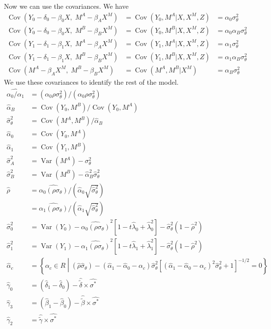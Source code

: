 \documentclass[11pt,letterpaper]{article}
\DeclareMathOperator{\Var}{Var}
\DeclareMathOperator{\Cov}{Cov}
\begin{document}
Now we can use the covariances. We have
\begin{align*}
\Cov(Y_0 - \delta_0 - \beta_0 X,\; M^A - \beta_A X^M) &= \Cov(Y_0, M^A | X, X^M, Z) &= \alpha_0 \sigma^2_\theta \\
\Cov(Y_0 - \delta_0 - \beta_0 X,\; M^B - \beta_B X^M) &= \Cov(Y_0, M^B | X, X^M, Z) &= \alpha_0 \alpha_B \sigma^2_\theta \\
\Cov(Y_1 - \delta_1 - \beta_1 X,\; M^A - \beta_A X^M) &= \Cov(Y_1, M^A | X, X^M, Z) &= \alpha_1 \sigma^2_\theta \\
\Cov(Y_1 - \delta_1 - \beta_1 X,\; M^B - \beta_B X^M) &= \Cov(Y_1, M^B | X, X^M, Z) &= \alpha_1 \alpha_B \sigma^2_\theta \\
\Cov(M^A - \beta_A X^M         ,\; M^B - \beta_B X^M) &= \Cov(M^A, M^B | X^M      ) &= \alpha_B \sigma^2_\theta
\end{align*}
We use these covariances to identify the rest of the model. 
\begin{align*}
\widehat{\alpha_0 / \alpha_1} &= (\alpha_0\rho\sigma^2_\theta)/(\alpha_0\rho\sigma^2_\theta) \\
\widehat \alpha_B &= \Cov(Y_0, M^B)/\Cov(Y_0, M^A)  \\
\widehat \sigma^2_\theta &= \Cov(M^A, M^B)/\widehat \alpha_B  \\
\widehat \alpha_0 &= \Cov(Y_0, M^A)  \\
\widehat \alpha_1 &= \Cov(Y_1, M^B)  \\
\widehat \sigma^2_A &= \Var(M^A) - \sigma^2_\theta  \\
\widehat \sigma^2_B  &= \Var(M^B) - \widehat \alpha_B^2 \widehat \sigma^2_\theta  \\
\widehat \rho &= \widehat{ \alpha_0 (\rho\sigma_\theta)} / (\widehat \alpha_0 \sqrt{\widehat \sigma_\theta^2})  \\
              &= \widehat{ \alpha_1 (\rho\sigma_\theta)} / (\widehat \alpha_1 \sqrt{\widehat \sigma_\theta^2})  \\
\widehat \sigma_0^2 &= \Var(Y_0) - \widehat{ \alpha_0 (\rho\sigma_\theta)}^2\left[ 1 - t\widehat \lambda_0 + \widehat \lambda_0^2 \right] - \widehat \sigma^2_\theta(1-\widehat \rho^2) \\
\widehat \sigma_1^2 &= \Var(Y_1) - \widehat{ \alpha_1 (\rho\sigma_\theta)}^2\left[ 1 - t\widehat \lambda_1 + \widehat \lambda_1^2 \right] - \widehat \sigma^2_\theta(1-\widehat \rho^2) \\
\widehat \alpha_c &= \left\{ \alpha_c \in R \middle | (\widehat \rho \widehat \sigma_\theta) - (\widehat \alpha_1 - \widehat \alpha_0 - \alpha_c)\widehat \sigma^2_\theta \left[(\widehat \alpha_1 - \widehat \alpha_0 - \alpha_c)^2 \widehat \sigma_\theta^2 + 1 \right]^{-1/2} =0 \right\} \\
\widehat \gamma_0 &= \left( \widehat \delta_1 -\widehat \delta_0 \right) - \widehat{\widetilde{\delta}} \times \widehat{\sigma^*} \\
\widehat \gamma_3 &= \left( \widehat \beta_1 - \widehat\beta_0 \right) - \widehat{\widetilde{\beta}} \times \widehat {\sigma^*} \\
\widehat \gamma_2 &= \widehat{\widetilde \gamma}\times \widehat{\sigma^*}
\end{align*}
\end{document}
